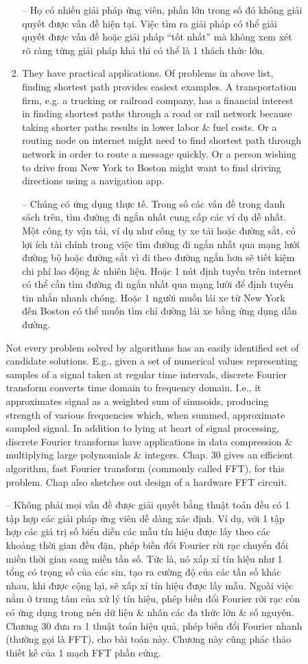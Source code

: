 \documentclass{article}
\begin{document}
\begin{itemize}
\begin{itemize}
\begin{itemize}
\begin{enumerate}
                -- Họ có nhiều giải pháp ứng viên, phần lớn trong số đó không giải quyết được vấn đề hiện tại. Việc tìm ra giải pháp có thể giải quyết được vấn đề hoặc giải pháp ``tốt nhất'' mà không xem xét rõ ràng từng giải pháp khả thi có thể là 1 thách thức lớn.
                \item They have practical applications. Of problems in above list, finding shortest path provides easiest examples. A transportation firm, e.g. a trucking or railroad company, has a financial interest in finding shortest paths through a road or rail network because taking shorter paths results in lower labor \& fuel costs. Or a routing node on internet might need to find shortest path through network in order to route a message quickly. Or a person wishing to drive from New York to Boston might want to ﬁnd driving directions using a navigation app.
                
                -- Chúng có ứng dụng thực tế. Trong số các vấn đề trong danh sách trên, tìm đường đi ngắn nhất cung cấp các ví dụ dễ nhất. Một công ty vận tải, ví dụ như công ty xe tải hoặc đường sắt, có lợi ích tài chính trong việc tìm đường đi ngắn nhất qua mạng lưới đường bộ hoặc đường sắt vì đi theo đường ngắn hơn sẽ tiết kiệm chi phí lao động \& nhiên liệu. Hoặc 1 nút định tuyến trên internet có thể cần tìm đường đi ngắn nhất qua mạng lưới để định tuyến tin nhắn nhanh chóng. Hoặc 1 người muốn lái xe từ New York đến Boston có thể muốn tìm chỉ đường lái xe bằng ứng dụng dẫn đường.
            \end{enumerate}
            Not every problem solved by algorithms has an easily identified set of candidate solutions. E.g., given a set of numerical values representing samples of a signal taken at regular time intervals, discrete Fourier transform converts time domain to frequency domain. I.e., it approximates signal as a weighted sum of sinusoids, producing strength of various frequencies which, when summed, approximate sampled signal. In addition to lying at heart of signal processing, discrete Fourier transforms have applications in data compression \& multiplying large polynomials \& integers. Chap. 30 gives an efficient algorithm, fast Fourier transform (commonly called FFT), for this problem. Chap also sketches out design of a hardware FFT circuit.
            
            -- Không phải mọi vấn đề được giải quyết bằng thuật toán đều có 1 tập hợp các giải pháp ứng viên dễ dàng xác định. Ví dụ, với 1 tập hợp các giá trị số biểu diễn các mẫu tín hiệu được lấy theo các khoảng thời gian đều đặn, phép biến đổi Fourier rời rạc chuyển đổi miền thời gian sang miền tần số. Tức là, nó xấp xỉ tín hiệu như 1 tổng có trọng số của các sin, tạo ra cường độ của các tần số khác nhau, khi được cộng lại, sẽ xấp xỉ tín hiệu được lấy mẫu. Ngoài việc nằm ở trung tâm của xử lý tín hiệu, phép biến đổi Fourier rời rạc còn có ứng dụng trong nén dữ liệu \& nhân các đa thức lớn \& số nguyên. Chương 30 đưa ra 1 thuật toán hiệu quả, phép biến đổi Fourier nhanh (thường gọi là FFT), cho bài toán này. Chương này cũng phác thảo thiết kế của 1 mạch FFT phần cứng.
            

\end{itemize}
\end{itemize}
\end{itemize}
\end{document}
